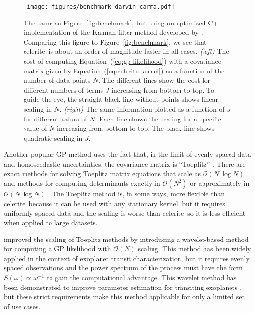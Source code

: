 \documentclass[manuscript, letterpaper]{aastex6}
\newcommand{\project}[1]{\textsf{#1}}
\newcommand{\celerite}{\project{celerite}}
\newcommand{\figureref}[1]{\ref{fig:#1}}
\newcommand{\Figure}[1]{Figure~\figureref{#1}}
\newcommand{\figurelabel}[1]{\label{fig:#1}}
\renewcommand{\eqref}[1]{\ref{eq:#1}}
\newcommand{\Eq}[1]{Equation~(\eqref{#1})}
\newcommand{\eq}[1]{\Eq{#1}}
\newcommand{\response}[1]{{#1}}
\begin{document}
\begin{figure}[tp]
    \begin{center}
        \texttt{[image: figures/benchmark\_darwin\_carma.pdf]}
        \caption{\response{The same as \Figure{benchmark}, but using an optimized
                \project{C++} implementation of the Kalman filter method developed by
                \citet{Kelly:2014}.
                Comparing this figure to \Figure{benchmark}, we see that \celerite\ is
                about an order of magnitude faster in all cases.
                \emph{(left)} The cost of computing \eq{gp-likelihood} with a covariance
                matrix given by \eq{celerite-kernel} as a function of the number of data
                points $N$.
                The different lines show the cost for different numbers of terms $J$
                increasing from bottom to top.
                To guide the eye, the straight black line without points
                shows linear scaling in $N$.
                \emph{(right)} The same information plotted as a function of $J$ for
                different values of $N$.
                Each line shows the scaling for a specific value of $N$ increasing from
                bottom to top.
                The black line shows quadratic scaling in $J$.}
            \figurelabel{benchmark-carma}}
    \end{center}
\end{figure}

Another popular GP method uses the fact that, in the limit of evenly-spaced
data and homoscedastic uncertainties, the covariance matrix is ``Toeplitz''
\citep[for example][]{Dillon:2013}.
There are exact methods for solving Toeplitz matrix equations that scale as
$\mathcal{O}(N\,\log N)$ and methods for computing determinants exactly in
$\mathcal{O}(N^2)$ or approximately in $\mathcal{O}(N\,\log N)$
\citep{Wilson:2014}.
The Toeplitz method is, in some ways, more flexible than \celerite\ because it
can be used with any stationary kernel, but it requires uniformly spaced data
and the scaling is worse than \celerite\ so it is less efficient when applied
to large datasets.

\citet{Carter:2009} improved the scaling of Toeplitz methods by introducing a
wavelet-based method for computing a GP likelihood with $\mathcal{O}(N)$
scaling.
This method has been widely applied in the context of exoplanet transit
characterization, but it requires evenly spaced observations and the power
spectrum of the process must have the form $S(\omega)\propto \omega^{-1}$ to
gain the computational advantage.
This wavelet method has been demonstrated to improve parameter estimation for
transiting exoplanets \citep{Carter:2009}, but these strict requirements make
this method applicable for only a limited set of use cases.
\end{document}

